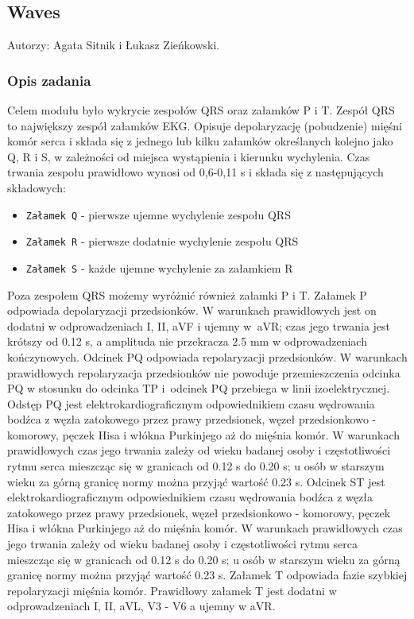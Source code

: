 \documentclass[a4paper, 11pt]{article}
\begin{document}
\subsection{Waves}
\label{sec:waves}
Autorzy: Agata Sitnik i Łukasz Zieńkowski.

\subsubsection{Opis zadania}
\label{sec:waves:desc}
Celem modułu było wykrycie zespołów QRS oraz załamków P i T.
Zespół QRS to największy zespół załamków EKG. Opisuje depolaryzację (pobudzenie) mięśni komór serca i składa się z jednego lub kilku załamków określanych kolejno jako Q, R i S, w zależności od miejsca wystąpienia i kierunku wychylenia. Czas trwania zespołu prawidłowo wynosi od 0,6-0,11 s i składa się z następujących składowych:
\begin{itemize}
     \item \verb|Załamek Q| - pierwsze ujemne wychylenie zespołu QRS
     \item \verb|Załamek R| - pierwsze dodatnie wychylenie zespołu QRS
     \item \verb|Załamek S| - każde ujemne wychylenie za załamkiem R
\end{itemize}

Poza zespołem QRS możemy wyróżnić również załamki P i T.
Załamek P odpowiada depolaryzacji przedsionków. W warunkach prawidłowych jest on dodatni w odprowadzeniach I, II, aVF i ujemny w~aVR; czas jego trwania jest krótszy od 0.12 s, a amplituda nie przekracza 2.5 mm w odprowadzeniach kończynowych.
Odcinek PQ odpowiada repolaryzacji przedsionków. W warunkach prawidłowych repolaryzacja przedsionków nie powoduje przemieszczenia odcinka PQ w stosunku do odcinka TP i~odcinek PQ przebiega w linii izoelektrycznej.
Odstęp PQ jest elektrokardiograficznym odpowiednikiem czasu wędrowania bodźca z węzła zatokowego
przez prawy przedsionek, węzeł przedsionkowo - komorowy, pęczek Hisa i włókna Purkinjego aż do mięśnia komór. W warunkach prawidłowych czas jego trwania zależy od wieku badanej osoby i częstotliwości rytmu serca mieszcząc się w granicach od 0.12 s do 0.20 s; u osób w starszym wieku za górną granicę normy można przyjąć wartość 0.23 s.
Odcinek ST jest elektrokardiograficznym odpowiednikiem czasu wędrowania bodźca z węzła zatokowego przez prawy przedsionek, węzeł przedsionkowo - komorowy, pęczek Hisa i włókna Purkinjego aż do mięśnia komór. W warunkach prawidłowych czas jego trwania zależy od wieku badanej osoby i częstotliwości rytmu serca mieszcząc się w granicach od 0.12 s do 0.20 s; u osób w starszym wieku za górną granicę normy można przyjąć wartość 0.23 s.
Załamek T odpowiada fazie szybkiej repolaryzacji mięśnia komór. Prawidłowy załamek T jest dodatni w odprowadzeniach I, II, aVL, V3 - V6 a ujemny w aVR.
\end{document}
